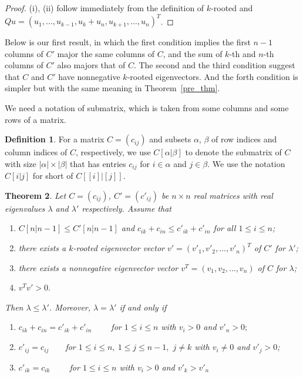 \documentclass[12pt, a4paper]{article}
\theoremstyle{plain}
\newtheorem{thm}{Theorem}[section]
\theoremstyle{definition}
\newtheorem{defn}[thm]{Definition}
\begin{document}
\begin{proof}
(i), (ii) follow immediately from the definition of $k$-rooted and
 $Qu=(u_1,\ldots, u_{k-1},u_k+u_n, u_{k+1}, \ldots,  u_n)^T$.
\end{proof}

Below is our first result, in which the first condition implies the first $n-1$ columns of $C'$ major
 the same columns of $C$, and the sum of $k$-th and $n$-th columns of $C'$ also majors that of $C$. The second and the third condition
 suggest that $C$ and $C'$ have nonnegative $k$-rooted eigenvectors. And the forth condition is simpler
  but with the same meaning in Theorem~\ref{pre_thm}. 


We need a notation of submatrix, which is taken from some columns and some rows of a matrix.

\begin{defn}
    For a matrix $C=(c_{ij})$ and subsets $\alpha$, $\beta$ of row indices and column
    indices of $C$, respectively, we use $C[\alpha|\beta]$ to denote the
    submatrix of $C$ with size $ |\alpha| \times |\beta| $ that has entries $c_{ij}$ for $i\in \alpha$
    and $j\in\beta$. We use the notation $C[i|j]$ for short of $C[[i]|[j]].$
\end{defn}





\begin{thm}\label{thm_main}
    Let $C=(c_{ij})$, $C'=(c'_{ij})$ be  $n\times n$ real matrices with real eigenvalues $\lambda$ and $\lambda'$ respectively.
Assume that
\begin{enumerate}[label=(\roman*)]
\item \label{thm_main:condition_i} $C[n|n-1]\leq C'[n|n-1]$ and $c_{ik}+c_{in}\leq c'_{ik}+c'_{in}$ for all $1\leq i\leq n$;
\item \label{thm_main:condition_ii} there exists a $k$-rooted eigenvector vector $v'=(v'_1, v'_2, \ldots, v'_n)^T$ of $C'$ for $\lambda'$;
\item \label{thm_main:condition_iii}there exists a nonnegative eigenvector vector $v^T=(v_1, v_2, \ldots, v_n)$ of $C$ for $\lambda$;
 \item \label{thm_main:condition_iv}$v^Tv'>0.$
\end{enumerate}
 Then $\lambda\leq \lambda'$.
Moreover, $\lambda=\lambda'$
if and only if
\begin{enumerate}[label=(\alph*)]
    \item \label{thm_main:equ_cond_a} $c_{ik}+c_{in}=c'_{ik}+c'_{in} \qquad$  for $1\leq i\leq n$ with $v_i>0$ and $v'_n>0;$
    \item \label{thm_main:equ_cond_b} $c'_{ij}=c_{ij}\qquad $for $1\leq i\leq n,~1\leq j\leq n-1,$ $j \neq k$ with $v_i\ne 0 $ and $v'_j>0$;
    \item \label{thm_main:equ_cond_c} $c'_{ik}=c_{ik} \qquad $  for $1\leq i \leq n$ with  $v_i>0$ and $ v'_{k}>v'_n$
\end{enumerate} 
\end{thm}
\end{document}
